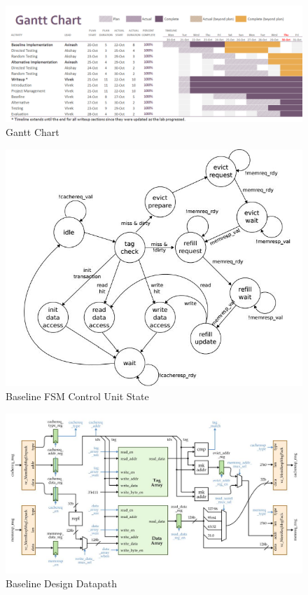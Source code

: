 \documentclass[10pt]{article}
\begin{document}

\begin{figure}[b]
\centering
\includegraphics[scale=0.5, angle=90]{gantt}
\caption{Gantt Chart}
\label{fig:gantt}
\end{figure}


\begin{figure}[b]
\centering
\includegraphics[scale=0.8]{state}
\caption{Baseline FSM Control Unit State}
\label{fig:state}
\end{figure}


\begin{figure}[b]
\centering
\includegraphics[scale=0.6]{baseline}
\caption{Baseline Design Datapath}
\label{fig:baseline}
\end{figure}
\end{document}

